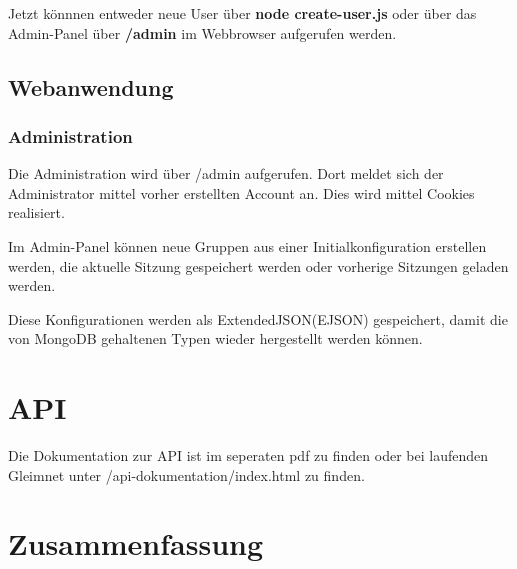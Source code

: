 \documentclass[12pt]{article} %
\begin{document}
Jetzt könnnen entweder neue User über \textbf{node create-user.js} oder über das Admin-Panel über \textbf{/admin} im Webbrowser aufgerufen werden.

\subsection{Webanwendung}
\subsubsection{Administration}
Die Administration wird über /admin aufgerufen. Dort meldet sich der Administrator mittel vorher erstellten Account an. Dies wird mittel Cookies realisiert.

Im Admin-Panel können neue Gruppen aus einer Initialkonfiguration erstellen werden, die aktuelle Sitzung gespeichert werden oder vorherige Sitzungen geladen werden.

Diese Konfigurationen werden als ExtendedJSON(EJSON) gespeichert, damit die von MongoDB gehaltenen Typen wieder hergestellt werden können.

\section{API}
Die Dokumentation zur API ist im seperaten pdf zu finden oder bei laufenden Gleimnet unter /api-dokumentation/index.html zu finden.




\section{Zusammenfassung}



\begin{thebibliography}{99} %


\end{thebibliography}

\end{document}
